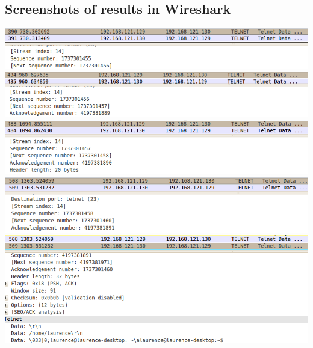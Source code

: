 \documentclass[12pt]{article}
\begin{document}
\subsection{Screenshots of results in Wireshark}
\includegraphics[width=160mm]{task41.png}
\includegraphics[width=160mm]{task42.png}
\includegraphics[width=160mm]{task43.png}
\includegraphics[width=160mm]{task44.png}
\includegraphics[width=160mm]{task45.png}
\enddocument
\end{document}
